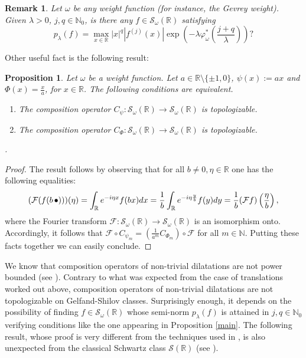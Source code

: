\documentclass[12pt,reqno]{amsart} %
\newtheorem{remark}[theorem]{Remark}
\newtheorem{prop}[theorem]{Proposition}
\numberwithin{equation}{section}
\begin{document}
				\begin{remark}
					Let $\omega$ be any weight function (for instance, the Gevrey weight). Given $\lambda>0$, $j,q\in\mathbb{N}_0$, is there any   $f\in\mathcal{S}_\omega(\mathbb{R})$  satisfying
					\begin{equation*}
						p_\lambda(f)=\max_{x\in\mathbb{R}} |x|^q |f^{(j)}(x)|  \exp\left(-\lambda \varphi_\omega^*\left(\frac{j+q}{\lambda}\right)\right)?
					\end{equation*}
				\end{remark}
			
			 Other useful fact is the following result:
			
				\begin{prop}\label{remarkFourier}
					Let $\omega$ be a weight function. Let $a\in\mathbb{R}\setminus\{\pm 1,0\}$, $\psi(x):=a x$ and $\Phi(x)=\frac{x}{a}$, for  $x\in\mathbb{R}$. The following conditions are equivalent.
					\begin{enumerate}
						\item The composition operator $C_\psi:\mathcal{S}_{\omega}(\mathbb{R})\to \mathcal{S}_{\omega}(\mathbb{R})$ is topologizable.
						\item The composition operator $C_\Phi:\mathcal{S}_{\omega}(\mathbb{R})\to \mathcal{S}_{\omega}(\mathbb{R})$ is topologizable.
					\end{enumerate}.
				\end{prop}
				\begin{proof}
					The result follows by observing that for all $b\not=0, \eta\in\mathbb{R}$ one has the following equalities: 
					\begin{equation*}
							(\mathcal{F}(f(b\hspace{0.05cm}\bullet)))(\eta) =\int_\mathbb{R} e^{-i \eta x}f(bx)dx=\frac{1}{b}\int_\mathbb{R}e^{-i\eta \frac{y}{b}}f(y)dy =\frac{1}{b} (\mathcal{F}f)\left(\frac{\eta}{b}\right),
					\end{equation*} 
					where the Fourier transform $\mathcal{F}: \mathcal{S}_{\omega}(\mathbb{R})\to \mathcal{S}_{\omega}(\mathbb{R})$ is an isomorphism onto. Accordingly, it follows that  $\mathcal{F} \circ C_{\psi_m}=(\frac{1}{a^m}C_{\Phi_m})\circ \mathcal{F}$ for all $m\in\mathbb{N}$. Putting these facts together we can easily conclude.
				\end{proof}
			
				We know that composition operators of non-trivial dilatations are not power bounded (see \cite[Proposition 3.1]{RACSAM}). Contrary to what was expected from the case of translations worked out above, composition operators of non-trivial dilatations are not topologizable on Gelfand-Shilov classes. Surprisingly enough, it depends on the possibility of finding $f\in \mathcal{S}_{\omega}(\mathbb{R})$ whose semi-norm $p_\lambda(f)$ is attained in $j,q\in\mathbb{N}_0$ verifying conditions like the one appearing in Proposition \ref{main}. The following result, whose proof is very different from the techniques used in \cite{jmaa, RACSAM}, is also unexpected from the classical Schwartz class $\mathcal{S}(\mathbb{R})$ (see \cite[Example 4.15.]{akj}).
				
\end{document}

